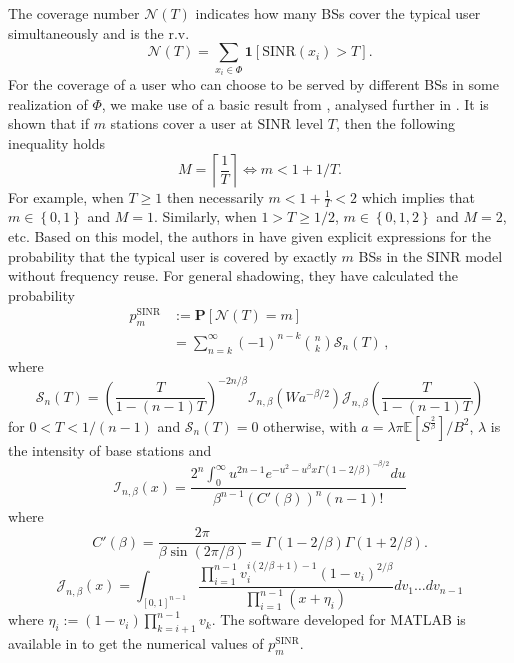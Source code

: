 \documentclass[conference,twocolum,final]{IEEEtran}
\begin{document}
The coverage number $\mathcal{N}\left(T\right)$ indicates how many BSs cover the typical user simultaneously and is the r.v.
\begin{equation}
\label{NT}
\mathcal{N}\left(T\right)  =  \sum_{x_i\in\Phi}\mathbf{1}[\mathrm{SINR}(x_i)>T].
\end{equation}
For the coverage of a user who can choose to be served by different BSs  in some realization of $\Phi$, we make use of a basic result from \cite[Proposition 6.2]{BacBlaVol1}, analysed further in \cite{KeelerBartek13}. It is shown that if $m$ stations cover a user at $\mathrm{SINR}$ level $T$, then the following inequality holds
\begin{equation}
\label{SINRT}
M= \left \lceil{\frac{1}{T}}\right \rceil  \Leftrightarrow  m< 1+1/T.
\end{equation}
For example, when $T\geq 1$ then necessarily $m< 1+\frac{1}{T}<2$ which implies that $m\in\left\{0,1\right\}$ and $M=1$. Similarly, when $1> T\geq1/2$,  $m\in\left\{0,1,2\right\}$ and $M=2$, etc. Based on this model, the authors in \cite{KeelerBartek13} have given explicit expressions for the probability that the typical user is covered by exactly $m$ BSs in the $\mathrm{SINR}$ model without frequency reuse. For general shadowing, they have calculated the probability 
\begin{align}
\label{pSINR}
p_m^{\mathrm{SINR}} &:=  \mathbf{P}\left[\mathcal{N}\left(T\right)=m\right]\\
&=\sum_{n=k}^{\infty}  (-1)^{n-k}{n\choose k}\mathcal{S}_n(T)\,,\nonumber
\end{align}
where  
$$\mathcal{S}_n(T)=\textstyle{\left(\frac{T}{1-(n-1)T}\right)^{-2n/\beta}}  \mathcal{I}_{n,\beta}(Wa^{-\beta/2})  \mathcal{J}_{n,\beta}\textstyle{\left(\frac{T}{1-(n-1)T}\right)}$$
for $0<T<1/(n-1)$  and $\mathcal{S}_n(T)=0$ otherwise, 
with $a=\lambda\pi \mathbb{E}[S^{\frac{2}{\beta}}]/B^{2}$, $\lambda$ is the intensity of base stations and 
\begin{equation}\label{In}
\mathcal{I}_{n,\beta}(x)=\frac{2^n
\int_0^{\infty} u^{2n-1}e^{-u^2-u^\beta x\Gamma(1-2/\beta)^{-\beta/2}} du
}{\beta^{n-1}(C'(\beta))^n(n-1)!}
\end{equation}
where 
\begin{equation}
 C'(\beta)=\frac{2\pi}{\beta\sin(2\pi/\beta)}=
\Gamma(1-2/\beta)\Gamma(1+2/\beta).
\end{equation}
\begin{equation}\label{e.Jn}
 \mathcal{J}_{n,\beta}(x)=\int_{[0,1]^{n-1}}
 \frac{   \prod\limits_{i=1}^{n-1}   v_i^{i(2/\beta+1)-1}(1-v_i)^{2/\beta}
  }{\prod\limits_{i=1}^{n-1} (x+\eta_i)} dv_1\dots
dv_{n-1}
\end{equation}
where 
$\eta_i:=(1-v_i)\prod_{k=i+1}^{n-1}v_k$.
The software developed for MATLAB is available in \cite{KeelerMATLABk} to get the numerical values of $p_m^{\mathrm{SINR}}$. 
\end{document}
